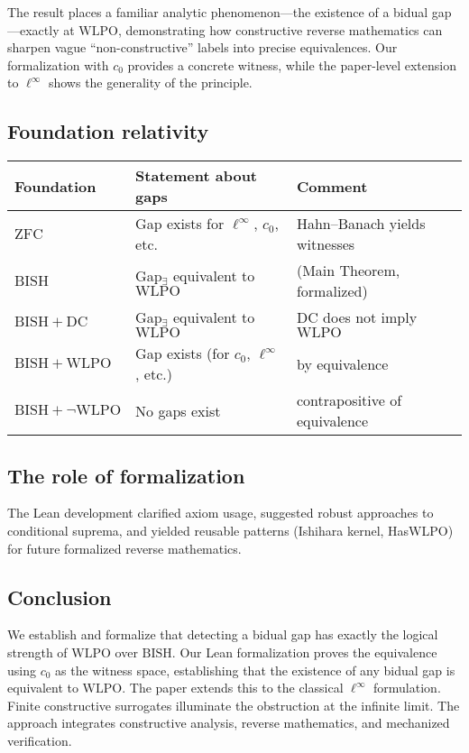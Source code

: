 \documentclass[11pt]{article}  %
\newcommand{\WLPO}{\mathrm{WLPO}}
\newcommand{\BISH}{\mathrm{BISH}}
\newcommand{\DC}{\mathrm{DC}}
\newcommand{\ZFC}{\mathrm{ZFC}}
\begin{document}
The result places a familiar analytic phenomenon---the existence of a bidual gap---exactly at $\WLPO$, demonstrating how constructive reverse mathematics can sharpen vague ``non-constructive'' labels into precise equivalences. Our formalization with $c_0$ provides a concrete witness, while the paper-level extension to $\ell^\infty$ shows the generality of the principle.

\subsection{Foundation relativity}

\begin{center}
\small %
\begin{tabular}{lll}
\toprule
Foundation & Statement about gaps & Comment \\
\midrule
$\ZFC$ & Gap exists for $\ell^\infty$, $c_0$, etc. & Hahn--Banach yields witnesses \\
$\BISH$ & Gap$_{\exists}$ equivalent to $\WLPO$ & (Main Theorem, formalized) \\
$\BISH+\DC$ & Gap$_{\exists}$ equivalent to $\WLPO$ & $\DC$ does not imply $\WLPO$ \\
$\BISH+\WLPO$ & Gap exists (for $c_0$, $\ell^\infty$, etc.) & by equivalence \\
$\BISH+\neg\WLPO$ & No gaps exist & contrapositive of equivalence \\
\bottomrule
\end{tabular}
\end{center}

\subsection{The role of formalization}

The Lean development clarified axiom usage, suggested robust approaches to conditional suprema, and yielded reusable patterns (Ishihara kernel, HasWLPO) for future formalized reverse mathematics.

\subsection{Conclusion}

We establish and formalize that detecting a bidual gap has exactly the logical strength of $\WLPO$ over $\BISH$. Our Lean formalization proves the equivalence using $c_0$ as the witness space, establishing that the existence of any bidual gap is equivalent to $\WLPO$. The paper extends this to the classical $\ell^\infty$ formulation. Finite constructive surrogates illuminate the obstruction at the infinite limit. The approach integrates constructive analysis, reverse mathematics, and mechanized verification.
\end{document}
